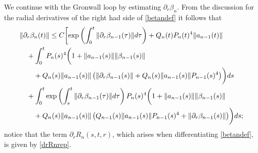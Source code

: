 \documentclass[11pt]{article}
\begin{document}
We continue with the Gronwall loop by estimating $\partial_r \beta_n$. 
From the discussion for the radial derivatives of the right had side
of \eqref{betandef} it follows that
\begin{align}\label{drbetanest}
 &\|\partial_r \beta_n(t)\| \leq
  C \biggl[
    \exp\left(\int_0^t\|\partial_r \beta_{n-1}(\tau)\| d\tau\right)
    + Q_n(t) P_n(t)^4 \|a_{n-1}(t)\|\notag \\
    &\quad {}+ \int_0^t P_n(s)^4 \biggl(1+\|a_{n-1}(s)\| \|\beta_{n-1}(s)\|\notag\\
    &\qquad + Q_n(s) \|a_{n-1}(s)\|
    \left(\|\partial_r\beta_{n-1}(s)\|+Q_n(s)\|a_{n-1}(s)\| P_{n-1}(s)^4\right)
    \biggr) ds\notag\\
    &\quad {}+ \int_0^t
    \exp\left(\int_s^t\|\partial_r \beta_{n-1}(\tau)\| d\tau\right) P_n(s)^4
    \biggl(1+\|a_{n-1}(s)\| \|\beta_{n-1}(s)\|\notag\\
    &\qquad + Q_n(s) \|a_{n-1}(s)\|
    \left(Q_{n-1}(s)\|a_{n-1}(s)\| P_{n-1}(s)^4
    +\|\partial_r\beta_{n-1}(s)\|\right)\biggr) ds;
\end{align}
notice that the term $\partial_r R_n(s,t,r)$, which arises when differentiating
\eqref{betandef}, is given by \eqref{drRnrep}.
\end{document}
